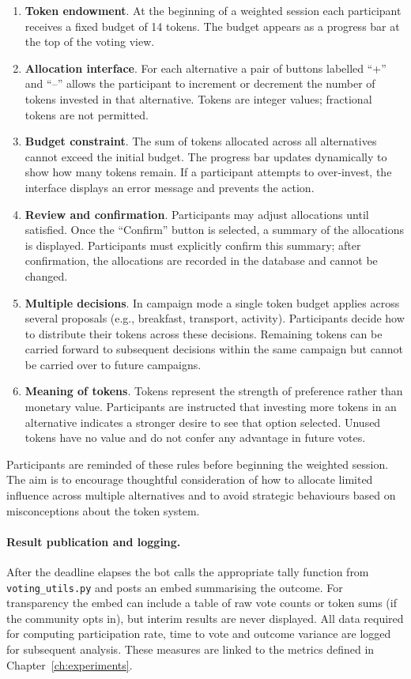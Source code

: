 \begin{enumerate}
    \item \textbf{Token endowment}.  At the beginning of a weighted
    session each participant receives a fixed budget of 14 tokens.  The
    budget appears as a progress bar at the top of the voting view.
    \item \textbf{Allocation interface}.  For each alternative a pair
    of buttons labelled “+” and “–” allows the participant to increment
    or decrement the number of tokens invested in that alternative.
    Tokens are integer values; fractional tokens are not permitted.
    \item \textbf{Budget constraint}.  The sum of tokens allocated across
    all alternatives cannot exceed the initial budget.  The progress bar
    updates dynamically to show how many tokens remain.  If a participant
    attempts to over‑invest, the interface displays an error message and
    prevents the action.
    \item \textbf{Review and confirmation}.  Participants may adjust
    allocations until satisfied.  Once the “Confirm” button is
    selected, a summary of the allocations is displayed.  Participants
    must explicitly confirm this summary; after confirmation, the
    allocations are recorded in the database and cannot be changed.
    \item \textbf{Multiple decisions}.  In campaign mode a single token
    budget applies across several proposals (e.g., breakfast, transport,
    activity).  Participants decide how to distribute their tokens
    across these decisions.  Remaining tokens can be carried forward to
    subsequent decisions within the same campaign but cannot be carried
    over to future campaigns.
    \item \textbf{Meaning of tokens}.  Tokens represent the strength of
    preference rather than monetary value.  Participants are instructed
    that investing more tokens in an alternative indicates a stronger
    desire to see that option selected.  Unused tokens have no value
    and do not confer any advantage in future votes.
\end{enumerate}

Participants are reminded of these rules before beginning the weighted
session.  The aim is to encourage thoughtful consideration of how to
allocate limited influence across multiple alternatives and to avoid
strategic behaviours based on misconceptions about the token system.

\paragraph{Result publication and logging.}  After the deadline
elapses the bot calls the appropriate tally function from
\texttt{voting\_utils.py} and posts an embed summarising the outcome.
For transparency the embed can include a table of raw vote counts or
token sums (if the community opts in), but interim results are never
displayed.  All data required for computing participation rate, time to
vote and outcome variance are logged for subsequent analysis.  These
measures are linked to the metrics defined in Chapter~\ref{ch:experiments}.